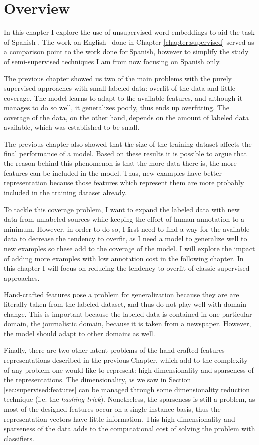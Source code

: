 \section{Overview}

In this chapter I explore the use of unsupervised word embeddings to aid the
task of Spanish \vsd. The work on English \vsd~done in Chapter
\ref{chapter:supervised} served as a comparison point to the work done for
Spanish, however to simplify the study of semi-supervised techniques I am from
now focusing on Spanish only.

The previous chapter showed us two of the main problems with the purely
supervised approaches with small labeled data: overfit of the data and little
coverage. The model learns to adapt to the available features, and although it
manages to do so well, it generalizes poorly, thus ends up overfitting. The
coverage of the data, on the other hand, depends on the amount of labeled data
available, which was established to be small. 

The previous chapter also showed that the size of the training dataset affects
the final performance of a model. Based on these results it is possible to
argue that the reason behind this phenomenon is that the more data there is,
the more features can be included in the model. Thus, new examples have better
representation because those features which represent them are more probably
included in the training dataset already.

To tackle this coverage problem, I want to expand the labeled data with new
data from unlabeled sources while keeping the effort of human annotation to a
minimum. However, in order to do so, I first need to find a way for the
available data to decrease the tendency to overfit, as I need a model to
generalize well to new examples so these add to the coverage of the model. I
will explore the impact of adding more examples with low annotation cost in the
following chapter. In this chapter I will focus on reducing the tendency to
overfit of classic supervised approaches.

Hand-crafted features pose a problem for generalization because they are are
literally taken from the labeled dataset, and thus do not play well with domain
change. This is important because the labeled data is contained in one
particular domain, the journalistic domain, because it is taken from a
newspaper. However, the model should adapt to other domains as well.

Finally, there are two other latent problems of the hand-crafted features
representations described in the previous Chapter, which add to the complexity
of any problem one would like to represent: high dimensionality and sparseness
of the representations. The dimensionality, as we saw in Section
\ref{sec:supervised:features} can be managed through some dimensionality
reduction technique (i.e. the {\em hashing trick}). Nonetheless, the sparseness
is still a problem, as most of the designed features occur on a single instance
basis, thus the representation vectors have little information. This high
dimensionality and sparseness of the data adds to the computational cost of
solving the problem with classifiers. 

